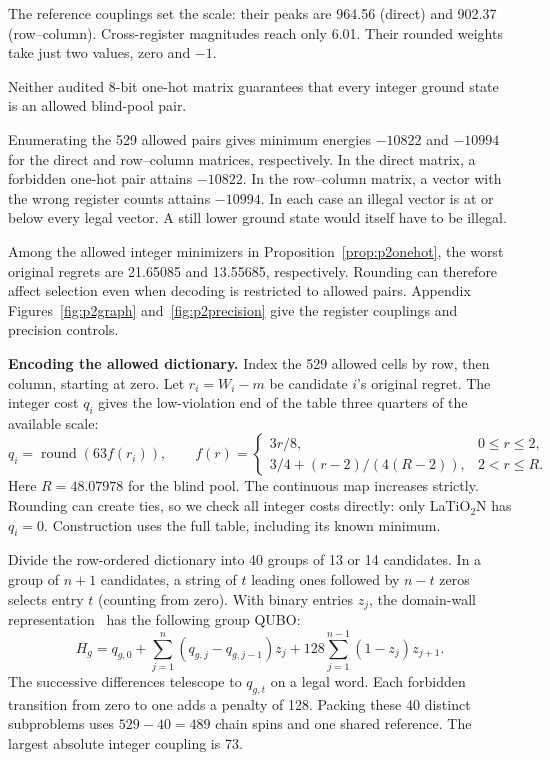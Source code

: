 The reference couplings set the scale: their peaks are 964.56 (direct) and 902.37 (row--column). Cross-register magnitudes reach only 6.01. Their rounded weights take just two values, zero and $-1$.

\begin{proposition}\label{prop:p2onehot}
Neither audited 8-bit one-hot matrix guarantees that every integer ground state is an allowed blind-pool pair.
\end{proposition}
\begin{p1proof}
Enumerating the 529 allowed pairs gives minimum energies $-10822$ and $-10994$ for the direct and row--column matrices, respectively. In the direct matrix, a forbidden one-hot pair attains $-10822$. In the row--column matrix, a vector with the wrong register counts attains $-10994$. In each case an illegal vector is at or below every legal vector. A still lower ground state would itself have to be illegal.
\end{p1proof}
Among the allowed integer minimizers in Proposition~\ref{prop:p2onehot}, the worst original regrets are 21.65085 and 13.55685, respectively. Rounding can therefore affect selection even when decoding is restricted to allowed pairs. Appendix Figures~\ref{fig:p2graph} and~\ref{fig:p2precision} give the register couplings and precision controls.

\textbf{Encoding the allowed dictionary.} Index the 529 allowed cells by row, then column, starting at zero. Let $r_i=W_i-m$ be candidate $i$'s original regret. The integer cost $q_i$ gives the low-violation end of the table three quarters of the available scale:
\begin{equation}
 q_i=\operatorname{round}(63 f(r_i)),\qquad
 f(r)=\begin{cases} 3r/8, &0\le r\le2,\\
 3/4+(r-2)/(4(R-2)), &2<r\le R .
 \end{cases}\label{eq:p2shape}
\end{equation}\nopagebreak[4]
\noindent Here $R=48.07978$ for the blind pool. The continuous map increases strictly. Rounding can create ties, so we check all integer costs directly: only LaTiO$_2$N has $q_i=0$. Construction uses the full table, including its known minimum.

Divide the row-ordered dictionary into 40 groups of 13 or 14 candidates. In a group of $n+1$ candidates, a string of $t$ leading ones followed by $n-t$ zeros selects entry $t$ (counting from zero). With binary entries $z_j$, the domain-wall representation~\cite{chancellor2019} has the following group QUBO:
\begin{equation}
 H_g=q_{g,0}+\sum_{j=1}^{n}(q_{g,j}-q_{g,j-1})z_j
       +128\sum_{j=1}^{n-1}(1-z_j)z_{j+1}.
 \label{eq:p2chain}
\end{equation}\nopagebreak[4]
\noindent The successive differences telescope to $q_{g,t}$ on a legal word. Each forbidden transition from zero to one adds a penalty of 128. Packing these 40 distinct subproblems uses $529-40=489$ chain spins and one shared reference. The largest absolute integer coupling is 73.

